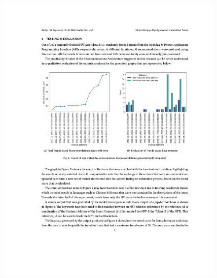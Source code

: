 \begin{figure}[h!]
\centering
\includegraphics[width=\textwidth]{images/appendix/papers/trends/Exploration of the possibility of infusing Social Media Trends into generating NFT Recommendations 6.jpeg}
\end{figure}

